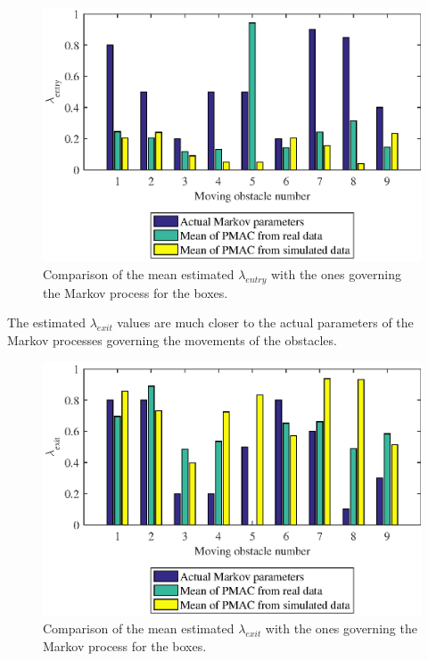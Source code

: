 \begin{figure}
    \centering
    \includegraphics[scale=1]{chapters/evaluation/figures/compare_learned_markov_entry}
    \caption{Comparison of the mean estimated $\lambda_{entry}$ with the ones governing the Markov process for the boxes.}
    \label{fig:compare_learned_markov_entry}
\end{figure}

The estimated $\lambda_{exit}$ values are much closer to the actual  parameters of the Markov processes governing the movements of the obstacles.

\begin{figure}
    \centering
    \includegraphics[scale=1]{chapters/evaluation/figures/compare_learned_markov_exit}
    \caption{Comparison of the mean estimated $\lambda_{exit}$ with the ones governing the Markov process for the boxes.}
    \label{fig:compare_learned_markov_exit}
\end{figure}




